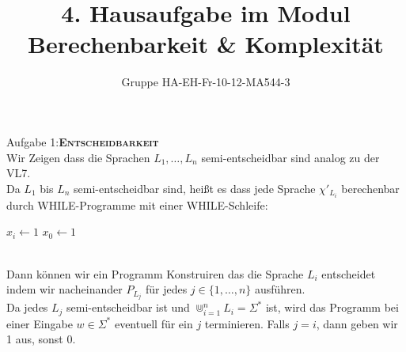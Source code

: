 \documentclass[a4paper,onecolumn,oneside,12pt,ngerman]{article}
\date{}
\title{4. Hausaufgabe im Modul \\ \glqq Berechenbarkeit \& Komplexität\grqq} %
\author{Gruppe HA-EH-Fr-10-12-MA544-3} %
\theoremstyle{plain} %
\theoremstyle{definition} %
\theoremstyle{remark} %
\theoremstyle{plain}
\begin{document}

\maketitle
\newpage
Aufgabe 1:\quad \textsc{\textbf{Entscheidbarkeit}}
\vspace{20pt}\\
Wir Zeigen dass die Sprachen $L_1, \ldots, L_n$ semi-entscheidbar sind analog zu der VL7.\\
Da $L_1$ bis $L_n$ semi-entscheidbar sind, heißt es dass jede Sprache $\chi'_{L_i}$ 
berechenbar durch WHILE-Programme mit einer WHILE-Schleife:

\begin{algorithm}[H]
    $x_i \leftarrow 1$\;
    $x_0 \leftarrow 1$\;
\end{algorithm}
\hfill\\
Dann können wir ein Programm Konstruiren das die Sprache $L_i$ entscheidet indem wir
nacheinander $P_{L_j}$ für jedes $j \in \{1, \ldots, n\}$ ausführen.\\
Da jedes $L_j$ semi-entscheidbar ist und $\Cup^n_{i=1} L_i = \Sigma^\ast$ ist,
wird das Programm bei einer Eingabe $w\in\Sigma^\ast$ eventuell für ein $j$ terminieren. Falls $j = i$, dann geben wir 1 aus, sonst 0.
\end{document}
